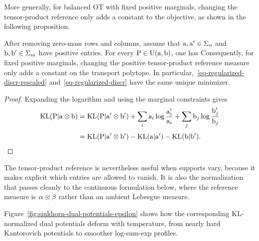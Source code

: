 More generally, for balanced OT with fixed positive marginals, changing the tensor-product reference only adds a constant to the objective, as shown in the following proposition.

\begin{prop}\label{prop-kl-shift}
	After removing zero-mass rows and columns, assume that $\mathrm{a},\mathrm{a}'\in\Sigma_n$ and $\mathrm{b},\mathrm{b}'\in\Sigma_m$ have positive entries. For every $\mathrm{P} \in \mathrm{U}(\mathrm{a},\mathrm{b})$, one has
Consequently, for fixed positive marginals, changing the positive tensor-product reference measure only adds a constant on the transport polytope. In particular,~\eqref{eq-regularized-discr-rescaled} and~\eqref{eq-regularized-discr} have the same unique minimizer.
\end{prop}

\begin{proof}
Expanding the logarithm and using the marginal constraints gives
\begin{align*}
	\mathrm{KL}(\mathrm{P}|\mathrm{a}\otimes\mathrm{b})
	&=
	\mathrm{KL}(\mathrm{P}|\mathrm{a}'\otimes\mathrm{b}')
	+
	\sum_i \mathrm{a}_i\log\frac{\mathrm{a}_i'}{\mathrm{a}_i}
	+
	\sum_j \mathrm{b}_j\log\frac{\mathrm{b}_j'}{\mathrm{b}_j} \\[.25em]
	&=
	\mathrm{KL}(\mathrm{P}|\mathrm{a}'\otimes\mathrm{b}')
	-\mathrm{KL}(\mathrm{a}|\mathrm{a}')-\mathrm{KL}(\mathrm{b}|\mathrm{b}').
\end{align*}
\end{proof}

The tensor-product reference is nevertheless useful when supports vary, because it makes explicit which entries are allowed to vanish. It is also the normalization that passes cleanly to the continuous formulation below, where the reference measure is $\alpha\otimes\beta$ rather than an ambient Lebesgue measure.

Figure~\ref{fig:sinkhorn-dual-potentials-epsilon} shows how the corresponding KL-normalized dual potentials deform with temperature, from nearly hard Kantorovich potentials to smoother log-sum-exp profiles.

